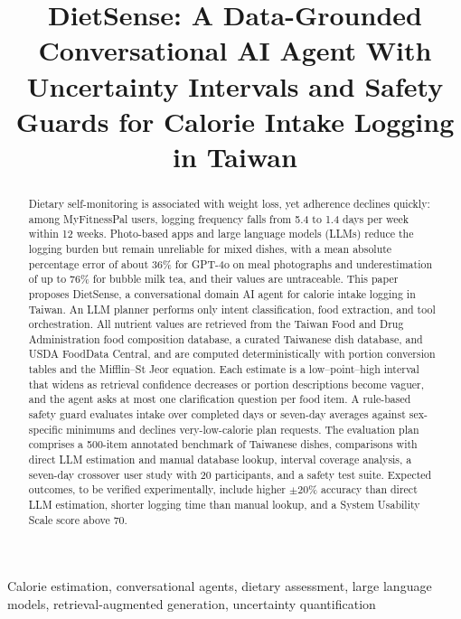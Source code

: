 \documentclass[conference]{IEEEtran}
\begin{document}
\title{DietSense: A Data-Grounded Conversational AI Agent With Uncertainty Intervals and Safety Guards for Calorie Intake Logging in Taiwan}

\author{
}

\maketitle

\begin{abstract}
Dietary self-monitoring is associated with weight loss, yet adherence declines quickly: among MyFitnessPal users, logging frequency falls from 5.4 to 1.4 days per week within 12 weeks. Photo-based apps and large language models (LLMs) reduce the logging burden but remain unreliable for mixed dishes, with a mean absolute percentage error of about 36\% for GPT-4o on meal photographs and underestimation of up to 76\% for bubble milk tea, and their values are untraceable. This paper proposes DietSense, a conversational domain AI agent for calorie intake logging in Taiwan. An LLM planner performs only intent classification, food extraction, and tool orchestration. All nutrient values are retrieved from the Taiwan Food and Drug Administration food composition database, a curated Taiwanese dish database, and USDA FoodData Central, and are computed deterministically with portion conversion tables and the Mifflin--St Jeor equation. Each estimate is a low--point--high interval that widens as retrieval confidence decreases or portion descriptions become vaguer, and the agent asks at most one clarification question per food item. A rule-based safety guard evaluates intake over completed days or seven-day averages against sex-specific minimums and declines very-low-calorie plan requests. The evaluation plan comprises a 500-item annotated benchmark of Taiwanese dishes, comparisons with direct LLM estimation and manual database lookup, interval coverage analysis, a seven-day crossover user study with 20 participants, and a safety test suite. Expected outcomes, to be verified experimentally, include higher $\pm$20\% accuracy than direct LLM estimation, shorter logging time than manual lookup, and a System Usability Scale score above 70.
\end{abstract}

\begin{IEEEkeywords}
Calorie estimation, conversational agents, dietary assessment, large language models, retrieval-augmented generation, uncertainty quantification
\end{IEEEkeywords}
\end{document}
